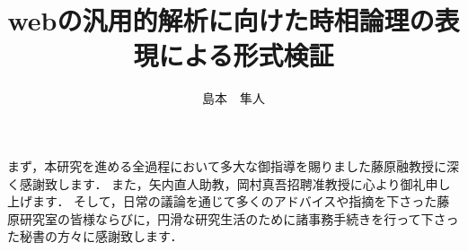 \documentclass[12pt,a4paper]{jbook}
\title{webの汎用的解析に向けた時相論理の表現による形式検証}
\author{島本　隼人}
\begin{document}
\coverpage
\tableofcontents
\listoffigures
\listoftables
\body








\acknowledgement
まず，本研究を進める全過程において多大な御指導を賜りました藤原融教授に深く感謝致します．
また，矢内直人助教，岡村真吾招聘准教授に心より御礼申し上げます．
そして，日常の議論を通じて多くのアドバイスや指摘を下さった藤原研究室の皆様ならびに，円滑な研究生活のために諸事務手続きを行って下さった秘書の方々に感謝致します．


 
\end{document}
